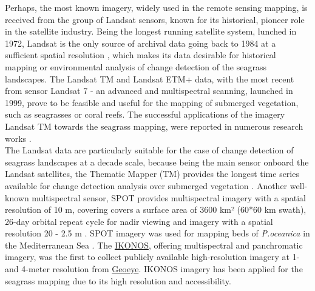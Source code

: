 \documentclass[11pt]{article}
\begin{document}
Perhaps, the most known imagery, widely used in the remote sensing mapping, is received from the
group of Landsat sensors, known for its historical, pioneer role in the satellite industry.
Being the longest running satellite system, lunched in 1972, Landsat is the only source of archival
data going back to 1984 at a sufficient spatial resolution \cite{Dekker05b}\label{Dekker05b}, which makes its data
desirable for historical mapping or environmental analysis of change detection of the seagrass
landscapes.
The \ac{Landsat TM} and \ac{Landsat ETM+} data, with the most recent from sensor Landsat 7 - an advanced
and multispectral scanning, launched in 1999, prove to be feasible and useful for the mapping of
submerged vegetation, such as seagrasses or coral reefs. The successful applications of the imagery
\ac{Landsat TM} towards the seagrass mapping, were reported in numerous research works \cite{Palandro03,Gullstroom06,Wabnitz08,Bierwirth93,Ferguson97,Rasib97}\label{Palandro03}\label{Gullstroom06}\label{Wabnitz08}\label{Bierwirth93}\label{Ferguson97}\label{Rasib97}.\\ The Landsat data are particularly suitable for the
case of change detection of seagrass landscapes at a decade scale, because being the main sensor
onboard the Landsat satellites, the Thematic Mapper (TM) provides the longest time series
available for change detection analysis over submerged vegetation \cite{Palandro03}\label{Palandro03}.
Another well-known multispectral sensor, \ac{SPOT} provides multispectral imagery with a spatial
resolution of 10 m, covering covers a surface area of 3600 km² (60*60 km swath), 26-day
orbital repeat cycle for nadir viewing and imagery with a spatial resolution 20 - 2.5 m
\cite{SPOT}\label{SPOT}. \ac{SPOT} imagery was used for mapping beds of \textit{P.oceanica} in the
Mediterranean Sea \cite{Pasqualini05} \label{Pasqualini05}. 
The \href{http://www.satimagingcorp.com/gallery-ikonos.html}{IKONOS}, offering multispectral and panchromatic imagery, was the first to collect publicly
available high-resolution imagery at 1- and 4-meter resolution from \href{http://www.geoeye.com}{Geoeye}. IKONOS
imagery has been applied for the seagrass mapping due to its high resolution and accessibility. 
\end{document}
